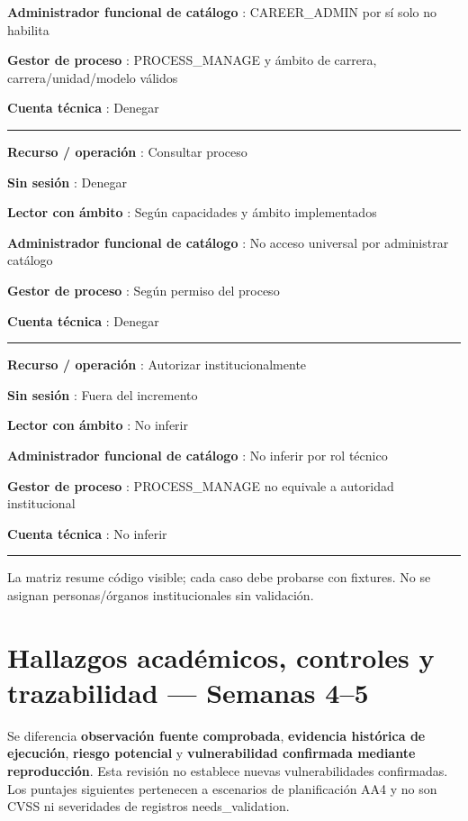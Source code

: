 \documentclass[12pt,a4paper]{report}
\begin{document}
\textbf{Administrador funcional de catálogo }: CAREER\_ADMIN por sí solo
no habilita

\textbf{Gestor de proceso }: PROCESS\_MANAGE y ámbito de carrera,
carrera/unidad/modelo válidos

\textbf{Cuenta técnica }: Denegar

\medskip\hrule\medskip

\textbf{Recurso / operación }: Consultar proceso

\textbf{Sin sesión }: Denegar

\textbf{Lector con ámbito }: Según capacidades y ámbito implementados

\textbf{Administrador funcional de catálogo }: No acceso universal por
administrar catálogo

\textbf{Gestor de proceso }: Según permiso del proceso

\textbf{Cuenta técnica }: Denegar

\medskip\hrule\medskip

\textbf{Recurso / operación }: Autorizar institucionalmente

\textbf{Sin sesión }: Fuera del incremento

\textbf{Lector con ámbito }: No inferir

\textbf{Administrador funcional de catálogo }: No inferir por rol
técnico

\textbf{Gestor de proceso }: PROCESS\_MANAGE no equivale a autoridad
institucional

\textbf{Cuenta técnica }: No inferir

\medskip\hrule\medskip

La matriz resume código visible; cada caso debe probarse con fixtures.
No se asignan personas/órganos institucionales sin validación.
\chapter{Hallazgos académicos, controles y trazabilidad --- Semanas
4--5}\label{ACD4-semana-4-anexo1-hallazgos-acaduxe9micos-controles-y-trazabilidad--semanas-45}

Se diferencia \textbf{observación fuente comprobada}, \textbf{evidencia
histórica de ejecución}, \textbf{riesgo potencial} y
\textbf{vulnerabilidad confirmada mediante reproducción}. Esta revisión
no establece nuevas vulnerabilidades confirmadas. Los puntajes
siguientes pertenecen a escenarios de planificación AA4 y no son CVSS ni
severidades de registros needs\_validation.
\end{document}
